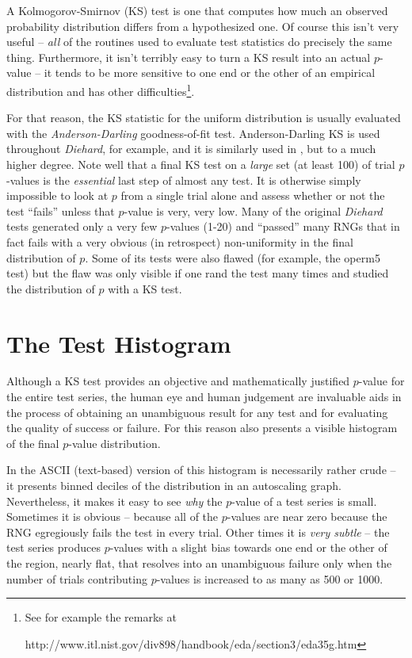 \documentclass{book}
\begin{document}
A Kolmogorov-Smirnov (KS) test is one that computes how much an observed
probability distribution differs from a hypothesized one.  Of course
this isn't very useful -- {\em all} of the routines used to evaluate
test statistics do precisely the same thing.  Furthermore, it isn't
terribly easy to turn a KS result into an actual $p$-value -- it tends
to be more sensitive to one end or the other of an empirical
distribution and has other difficulties\footnote{See for example the
remarks  at \\
\centerline{
 {http://www.itl.nist.gov/div898/handbook/eda/section3/eda35g.htm}}}.

For that reason, the KS statistic for the uniform distribution is
usually evaluated with the {\em Anderson-Darling} goodness-of-fit test.
Anderson-Darling KS is used throughout {\em Diehard}, for example, and
it is similarly used in \die, but to a much higher degree.  Note well
that a final KS test on a {\em large} set (at least 100) of trial
$p$-values is the {\em essential} last step of almost any \die test.  It
is otherwise simply impossible to look at $p$ from a single trial alone
and assess whether or not the test ``fails'' unless that $p$-value is
very, very low.  Many of the original {\em Diehard} tests generated only
a very few $p$-values (1-20) and ``passed'' many RNGs that in fact \die
fails with a very obvious (in retrospect) non-uniformity in the final
distribution of $p$.  Some of its tests were also flawed (for example,
the operm5 test) but the flaw was only visible if one rand the test many
times and studied the distribution of $p$ with a KS test.

\section{The Test Histogram}

Although a KS test provides an objective and mathematically justified
$p$-value for the entire test series, the human eye and human judgement
are invaluable aids in the process of obtaining an unambiguous result
for any test and for evaluating the quality of success or failure.  For
this reason \die also presents a visible histogram of the final
$p$-value distribution.

In the ASCII (text-based) version of \die this histogram is necessarily
rather crude -- it presents binned deciles of the distribution in an
autoscaling graph.  Nevertheless, it makes it easy to see {\em why} the
$p$-value of a test series is small.  Sometimes it is obvious -- because
all of the $p$-values are near zero because the RNG egregiously fails
the test in every trial.  Other times it is {\em very subtle} -- the
test series produces $p$-values with a slight bias towards one end or
the other of the region, nearly flat, that resolves into an unambiguous
failure only when the number of trials contributing $p$-values is
increased to as many as 500 or 1000.
\end{document}
